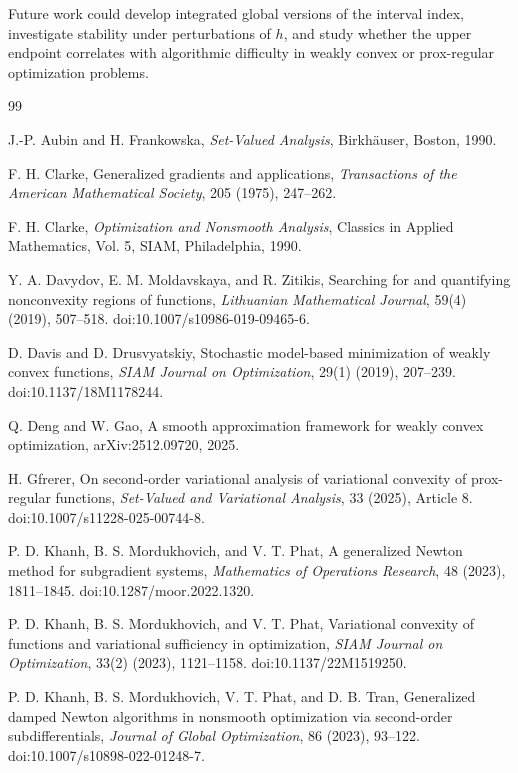 \documentclass[11pt]{article}
\numberwithin{equation}{section}
\begin{document}
	Future work could develop integrated global versions of the interval index, investigate stability under perturbations of \(h\), and study whether the upper endpoint correlates with algorithmic difficulty in weakly convex or prox-regular optimization problems.
	
	\begin{thebibliography}{99}
		
		J.-P. Aubin and H. Frankowska,
		\emph{Set-Valued Analysis},
		Birkh\"auser, Boston, 1990.
		
		F. H. Clarke,
		Generalized gradients and applications,
		\emph{Transactions of the American Mathematical Society},
		205 (1975), 247--262.
		
		F. H. Clarke,
		\emph{Optimization and Nonsmooth Analysis},
		Classics in Applied Mathematics, Vol. 5,
		SIAM, Philadelphia, 1990.
		
		Y. A. Davydov, E. M. Moldavskaya, and R. Zitikis,
		Searching for and quantifying nonconvexity regions of functions,
		\emph{Lithuanian Mathematical Journal},
		59(4) (2019), 507--518.
		doi:10.1007/s10986-019-09465-6.
		
		D. Davis and D. Drusvyatskiy,
		Stochastic model-based minimization of weakly convex functions,
		\emph{SIAM Journal on Optimization},
		29(1) (2019), 207--239.
		doi:10.1137/18M1178244.
		
		Q. Deng and W. Gao,
		A smooth approximation framework for weakly convex optimization,
		arXiv:2512.09720, 2025.
		
		H. Gfrerer,
		On second-order variational analysis of variational convexity of prox-regular functions,
		\emph{Set-Valued and Variational Analysis},
		33 (2025), Article 8.
		doi:10.1007/s11228-025-00744-8.
		
		P. D. Khanh, B. S. Mordukhovich, and V. T. Phat,
		A generalized Newton method for subgradient systems,
		\emph{Mathematics of Operations Research},
		48 (2023), 1811--1845.
		doi:10.1287/moor.2022.1320.
		
		P. D. Khanh, B. S. Mordukhovich, and V. T. Phat,
		Variational convexity of functions and variational sufficiency in optimization,
		\emph{SIAM Journal on Optimization},
		33(2) (2023), 1121--1158.
		doi:10.1137/22M1519250.
		
		P. D. Khanh, B. S. Mordukhovich, V. T. Phat, and D. B. Tran,
		Generalized damped Newton algorithms in nonsmooth optimization via second-order subdifferentials,
		\emph{Journal of Global Optimization},
		86 (2023), 93--122.
		doi:10.1007/s10898-022-01248-7.
		

\end{thebibliography}
\end{document}
